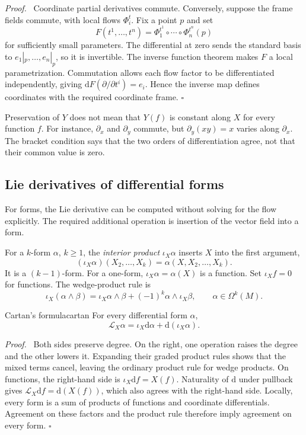 \documentclass[11pt,a4paper]{article}
\numberwithin{equation}{section}
\newcommand{\dd}{\mathrm d}
\newcommand{\Lie}{\mathcal L}
\newcommand{\proofend}{\unskip\nobreak\hfill\(\square\)\par}
\newenvironment{proof}{\par\noindent\textit{Proof.}\ }{\proofend}
\begin{document}
\begin{proof}
Coordinate partial derivatives commute. Conversely, suppose the frame
fields commute, with local flows \(\Phi_i^t\). Fix a point \(p\) and
set
\[
 F(t^1,\ldots,t^n)=\Phi_1^{t^1}\circ\cdots\circ\Phi_n^{t^n}(p)
\]
for sufficiently small parameters. The differential at zero sends the
standard basis to \(e_1|_p,\ldots,e_n|_p\), so it is invertible.
The inverse function theorem makes \(F\) a local parametrization.
Commutation allows each flow factor to be differentiated independently,
giving \(\dd F(\partial/\partial t^i)=e_i\). Hence the inverse map
defines coordinates with the required coordinate frame.
\end{proof}

Preservation of \(Y\) does not mean that \(Y(f)\) is constant along
\(X\) for every function \(f\). For instance, \(\partial_x\) and
\(\partial_y\) commute, but \(\partial_y(xy)=x\) varies along
\(\partial_x\). The bracket condition says that the two orders of
differentiation agree, not that their common value is zero.

\subsection{Lie derivatives of differential forms}

For forms, the Lie derivative can be computed without solving for the
flow explicitly. The required additional operation is insertion of the
vector field into a form.

For a \(k\)-form \(\alpha\), \(k\geq1\), the \emph{interior product}
\(\iota_X\alpha\) inserts \(X\) into the first argument,
\[
 (\iota_X\alpha)(X_2,\ldots,X_k)=\alpha(X,X_2,\ldots,X_k).
\]
It is a \((k-1)\)-form. For a one-form, \(\iota_X\alpha=\alpha(X)\)
is a function. Set \(\iota_Xf=0\) for functions. The wedge-product rule
is
\[
 \iota_X(\alpha\wedge\beta)
 =\iota_X\alpha\wedge\beta+(-1)^k\alpha\wedge\iota_X\beta,
 \qquad \alpha\in\Omega^k(M).
\]

\begin{theorem}{Cartan's formula}{cartan}
For every differential form \(\alpha\),
\begin{equation}
 \Lie_X\alpha=\iota_X\dd\alpha+\dd(\iota_X\alpha).
 \label{eq:cartan}
\end{equation}
\end{theorem}

\begin{proof}
Both sides preserve degree. On the right, one operation raises the
degree and the other lowers it. Expanding their graded product rules
shows that the mixed terms cancel, leaving the ordinary product rule
for wedge products. On functions, the right-hand side is
\(\iota_X\dd f=X(f)\).
Naturality of \(\dd\) under pullback gives
\(\Lie_X\dd f=\dd(X(f))\), which also agrees with the right-hand side.
Locally, every form is a sum of products of functions and coordinate
differentials. Agreement on these factors and the product rule therefore
imply agreement on every form.
\end{proof}
\end{document}
